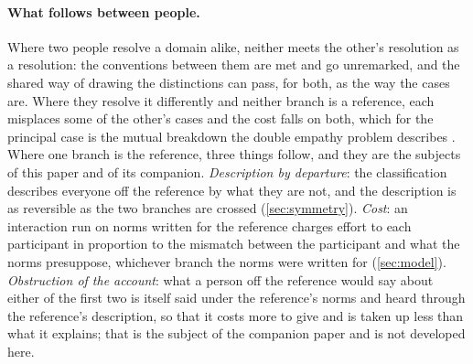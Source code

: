 \paragraph{What follows between people.} Where two people resolve a domain alike, neither meets the other's resolution as a resolution: the conventions between them are met and go unremarked, and the shared way of drawing the distinctions can pass, for both, as the way the cases are. Where they resolve it differently and neither branch is a reference, each misplaces some of the other's cases and the cost falls on both, which for the principal case is the mutual breakdown the double empathy problem describes \cite{Milton2012}. Where one branch is the reference, three things follow, and they are the subjects of this paper and of its companion. \emph{Description by departure}: the classification describes everyone off the reference by what they are not, and the description is as reversible as the two branches are crossed (\autoref{sec:symmetry}). \emph{Cost}: an interaction run on norms written for the reference charges effort to each participant in proportion to the mismatch between the participant and what the norms presuppose, whichever branch the norms were written for (\autoref{sec:model}). \emph{Obstruction of the account}: what a person off the reference would say about either of the first two is itself said under the reference's norms and heard through the reference's description, so that it costs more to give and is taken up less than what it explains; that is the subject of the companion paper \cite{Unconveyable} and is not developed here.

